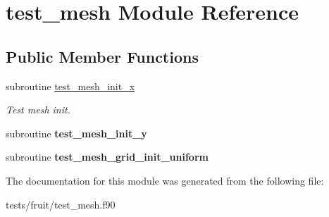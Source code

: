 \hypertarget{classtest__mesh}{\section{test\-\_\-mesh Module Reference}
\label{classtest__mesh}
}
\subsection*{Public Member Functions}
\begin{DoxyCompactItemize}
\item 
\hypertarget{classtest__mesh_aefee9ced0d5b0b047517fee735e591b1}{subroutine \hyperlink{classtest__mesh_aefee9ced0d5b0b047517fee735e591b1}{test\-\_\-mesh\-\_\-init\-\_\-x}}\label{classtest__mesh_aefee9ced0d5b0b047517fee735e591b1}

\begin{DoxyCompactList}\small\item\em Test mesh init. \end{DoxyCompactList}\item 
\hypertarget{classtest__mesh_a43a06b2d02180b7cbc23b691c4c27c2d}{subroutine {\bfseries test\-\_\-mesh\-\_\-init\-\_\-y}}\label{classtest__mesh_a43a06b2d02180b7cbc23b691c4c27c2d}

\item 
\hypertarget{classtest__mesh_aa61e9dc671df131db4c46a05772ec144}{subroutine {\bfseries test\-\_\-mesh\-\_\-grid\-\_\-init\-\_\-uniform}}\label{classtest__mesh_aa61e9dc671df131db4c46a05772ec144}

\end{DoxyCompactItemize}


The documentation for this module was generated from the following file\-:\begin{DoxyCompactItemize}
\item 
tests/fruit/test\-\_\-mesh.\-f90\end{DoxyCompactItemize}
